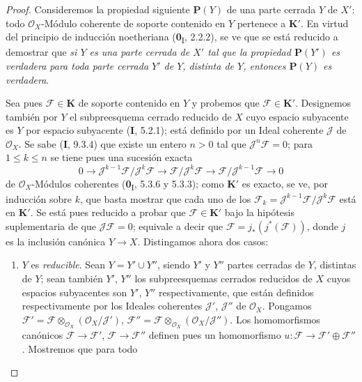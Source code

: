 \begin{proof}
Consideremos la propiedad siguiente $\boldsymbol{P}(Y)$ de una parte cerrada $Y$ de $X'$:
todo $\mathcal O_X$-Módulo coherente de soporte contenido en $Y$ pertenece a
$\boldsymbol{K}'$. En virtud del principio de inducción noetheriana (\textbf{0}\textsubscript{I},
2.2.2), se ve que se está reducido a demostrar que \emph{si $Y$ es una parte
cerrada de $X'$ tal que la propiedad $\boldsymbol{P}(Y')$ es verdadera para toda parte
cerrada $Y'$ de $Y$, distinta de $Y$, entonces $\boldsymbol{P}(Y)$ es verdadera}.

Sea pues $\mathcal F\in\boldsymbol{K}$ de soporte contenido en $Y$ y probemos que
$\mathcal F\in\boldsymbol{K}'$. Designemos también por $Y$ el subpreesquema cerrado reducido de
$X$ cuyo espacio subyacente es $Y$ por espacio subyacente (\textbf{I}, 5.2.1); está definido por un Ideal coherente $\mathcal J$ de $\mathcal O_X$. Se sabe (\textbf{I}, 9.3.4) que existe un
entero $n>0$ tal que $\mathcal J^n\mathcal F=0$; para $1\leq k\leq n$ se tiene
pues una sucesión exacta
\[
0\longrightarrow
\mathcal J^{k-1}\mathcal F/\mathcal J^k\mathcal F
\longrightarrow \mathcal F/\mathcal J^k\mathcal F
\longrightarrow \mathcal F/\mathcal J^{k-1}\mathcal F
\longrightarrow0
\]
de $\mathcal O_X$-Módulos coherentes (\textbf{0}\textsubscript{I}, 5.3.6 y 5.3.3);
como $\boldsymbol{K}'$ es exacto, se ve, por inducción sobre $k$, que basta mostrar
que cada uno de los
$\mathcal F_k=\mathcal J^{k-1}\mathcal F/\mathcal J^k\mathcal F$ está en
$\boldsymbol{K}'$. Se está pues reducido a probar que $\mathcal F\in\boldsymbol{K}'$ bajo la hipótesis
suplementaria de que $\mathcal J\mathcal F=0$; equivale a decir que
$\mathcal F=j_*(j^*(\mathcal F))$, donde $j$ es la inclusión canónica
$Y\to X$. Distingamos ahora dos casos:
\begin{enumerate}
\item[\textit{a)}] $Y$ es \emph{reducible}. Sean $Y=Y'\cup Y''$, siendo $Y'$ y $Y''$
partes cerradas de $Y$, distintas de $Y$; sean también $Y'$,
$Y''$ los subpreesquemas cerrados reducidos de $X$ cuyos espacios
subyacentes son $Y'$, $Y''$ respectivamente, que están definidos respectivamente por
los Ideales coherentes $\mathcal J'$, $\mathcal J''$ de $\mathcal O_X$. Pongamos
$\mathcal F'=\mathcal F\otimes_{\mathcal O_X}
(\mathcal O_X/\mathcal J')$,
$\mathcal F''=\mathcal F\otimes_{\mathcal O_X}
(\mathcal O_X/\mathcal J'')$.
Los homomorfismos canónicos $\mathcal F\to\mathcal F'$,
$\mathcal F\to\mathcal F''$ definen pues un homomorfismo
$u:\mathcal F\to\mathcal F'\oplus\mathcal F''$. Mostremos que para todo

\end{enumerate}
\end{proof}
